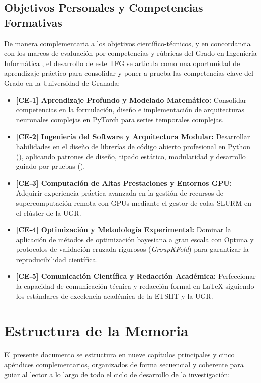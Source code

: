 \subsection{Objetivos Personales y Competencias Formativas}

De manera complementaria a los objetivos científico-técnicos, y en concordancia con los marcos de evaluación por competencias y rúbricas del Grado en Ingeniería Informática \cite{fernandez2023rubricas, guillen2025libro}, el desarrollo de este TFG se articula como una oportunidad de aprendizaje práctico para consolidar y poner a prueba las competencias clave del Grado en la Universidad de Granada:
\begin{itemize}
    \item \textbf{[CE-1] Aprendizaje Profundo y Modelado Matemático:} Consolidar competencias en la formulación, diseño e implementación de arquitecturas neuronales complejas en PyTorch para series temporales complejas.
    \item \textbf{[CE-2] Ingeniería del Software y Arquitectura Modular:} Desarrollar habilidades en el diseño de librerías de código abierto profesional en Python (), aplicando patrones de diseño, tipado estático, modularidad y desarrollo guiado por pruebas ().
    \item \textbf{[CE-3] Computación de Altas Prestaciones y Entornos GPU:} Adquirir experiencia práctica avanzada en la gestión de recursos de supercomputación remota con GPUs mediante el gestor de colas SLURM en el clúster de la UGR.
    \item \textbf{[CE-4] Optimización y Metodología Experimental:} Dominar la aplicación de métodos de optimización bayesiana a gran escala con Optuna y protocolos de validación cruzada rigurosos (\textit{GroupKFold}) para garantizar la reproducibilidad científica.
    \item \textbf{[CE-5] Comunicación Científica y Redacción Académica:} Perfeccionar la capacidad de comunicación técnica y redacción formal en LaTeX siguiendo los estándares de excelencia académica de la ETSIIT y la UGR.
\end{itemize}

\section{Estructura de la Memoria}
\label{sec:intro_estructura}

El presente documento se estructura en nueve capítulos principales y cinco apéndices complementarios, organizados de forma secuencial y coherente para guiar al lector a lo largo de todo el ciclo de desarrollo de la investigación:

